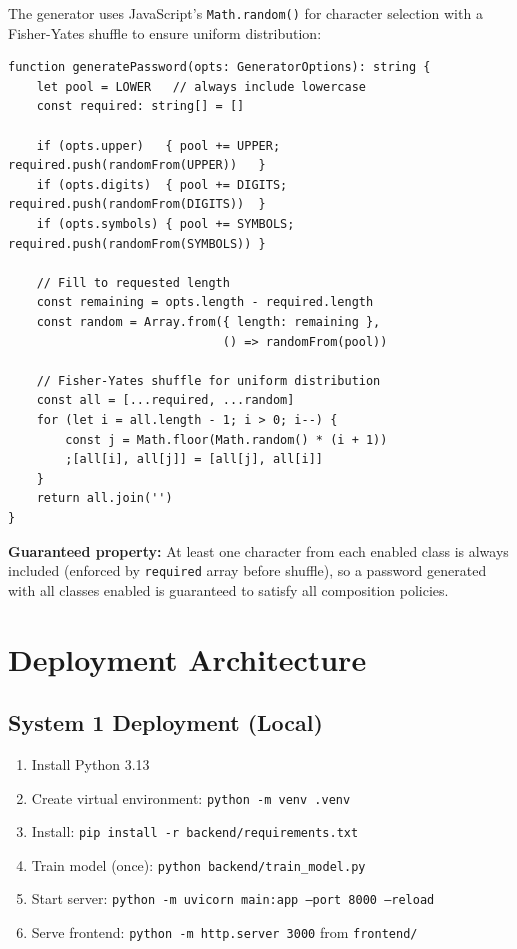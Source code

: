 \documentclass[12pt,a4paper]{article}
\begin{document}
The generator uses JavaScript's \texttt{Math.random()} for character selection
with a Fisher-Yates shuffle to ensure uniform distribution:

\begin{lstlisting}[style=tsstyle, caption={Password Generation Algorithm}]
function generatePassword(opts: GeneratorOptions): string {
    let pool = LOWER   // always include lowercase
    const required: string[] = []

    if (opts.upper)   { pool += UPPER;   required.push(randomFrom(UPPER))   }
    if (opts.digits)  { pool += DIGITS;  required.push(randomFrom(DIGITS))  }
    if (opts.symbols) { pool += SYMBOLS; required.push(randomFrom(SYMBOLS)) }

    // Fill to requested length
    const remaining = opts.length - required.length
    const random = Array.from({ length: remaining },
                              () => randomFrom(pool))

    // Fisher-Yates shuffle for uniform distribution
    const all = [...required, ...random]
    for (let i = all.length - 1; i > 0; i--) {
        const j = Math.floor(Math.random() * (i + 1))
        ;[all[i], all[j]] = [all[j], all[i]]
    }
    return all.join('')
}
\end{lstlisting}

\textbf{Guaranteed property:} At least one character from each enabled class
is always included (enforced by \texttt{required} array before shuffle), so
a password generated with all classes enabled is guaranteed to satisfy all
composition policies.

\section{Deployment Architecture}

\subsection{System 1 Deployment (Local)}

\begin{enumerate}
    \item Install Python 3.13
    \item Create virtual environment: \texttt{python -m venv .venv}
    \item Install: \texttt{pip install -r backend/requirements.txt}
    \item Train model (once): \texttt{python backend/train\_model.py}
    \item Start server: \texttt{python -m uvicorn main:app --port 8000 --reload}
    \item Serve frontend: \texttt{python -m http.server 3000} from \texttt{frontend/}
\end{enumerate}
\end{document}
